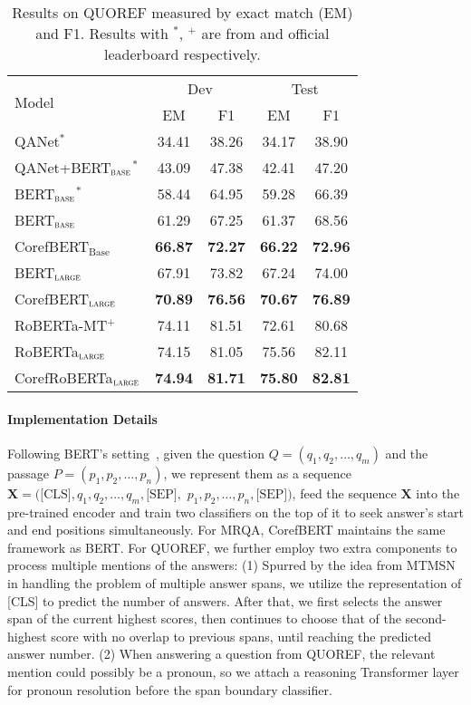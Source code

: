 \documentclass[11pt,a4paper]{article}
\newcommand\BASESIZE{$_{\small \textsc{base}}$\xspace}
\newcommand\LARGESIZE{$_{\small \textsc{large}}$\xspace}
\begin{document}
\begin{table}[!t]
\small
\centering
\begin{tabular}{l c c c c}
\toprule

\multirow{2}{*}{Model}   &\multicolumn{2}{c}{Dev}   &  \multicolumn{2}{c}{Test}  \\
                        &  EM        & F1            & EM        & F1 \\
\midrule
QANet$^*$ & 34.41& 38.26& 34.17& 38.90 \\
QANet+BERT\BASESIZE $^*$ & 43.09 & 47.38& 42.41& 47.20 \\
BERT\BASESIZE $^*$ & 58.44 & 64.95& 59.28& 66.39 \\
BERT\BASESIZE  & 61.29 &  67.25   & 61.37  & 68.56  \\
CorefBERT$_{\text{Base}}$  & \bf{66.87} & \bf{72.27} & \bf{66.22}& \bf{72.96} \\
\midrule
BERT\LARGESIZE  & 67.91 & 73.82 & 67.24  & 74.00  \\
CorefBERT\LARGESIZE  & \bf{70.89} & \bf{76.56} & \bf{70.67} & \bf{76.89}  \\
\midrule
RoBERTa-MT$^+$  & 74.11 & 81.51 & 72.61 & 80.68 \\
RoBERTa\LARGESIZE &  74.15 & 81.05 &  75.56 & 82.11 \\
CorefRoBERTa\LARGESIZE  & \bf{74.94} & \bf{81.71} & \bf{75.80} & \bf{82.81} \\
\bottomrule
\end{tabular}
\caption{Results on QUOREF measured by exact match (EM) and F1. Results with $^*$, $^+$ are from \citet{QUOREF} and official leaderboard respectively. }
\label{tab:QUOREF_results}
\end{table}

\vspace{-0.1em}
\paragraph{Implementation Details} Following BERT's setting~\citep{BERT}, given the question $Q = (q_1, q_2, \ldots, q_m)$ and the passage $P = (p_1, p_2, \ldots, p_n)$, we represent them as a sequence $\bm{X} = (\text{[CLS]},q_1, q_2, \ldots, q_m,\text{[SEP]},$ $p_1, p_2,\ldots, p_n,\text{[SEP]})$, feed the sequence $\bm{X}$ into the pre-trained encoder and train two classifiers on the top of it to seek answer's start and end positions simultaneously. For MRQA, CorefBERT maintains the same framework as BERT. For QUOREF, we further employ two extra components to process multiple mentions of the answers: (1) Spurred by the idea from MTMSN~\citep{MTMSN} in handling the problem of multiple answer spans, we utilize the representation of \textup{[CLS]} to predict the number of answers. After that, we first selects the answer span of the current highest scores, then continues to choose that of the second-highest score with no overlap to previous spans, until reaching the predicted answer number. 
(2) When answering a question from QUOREF, the relevant mention could possibly be a pronoun, so we attach a reasoning Transformer layer for pronoun resolution before the span boundary classifier.
\end{document}
